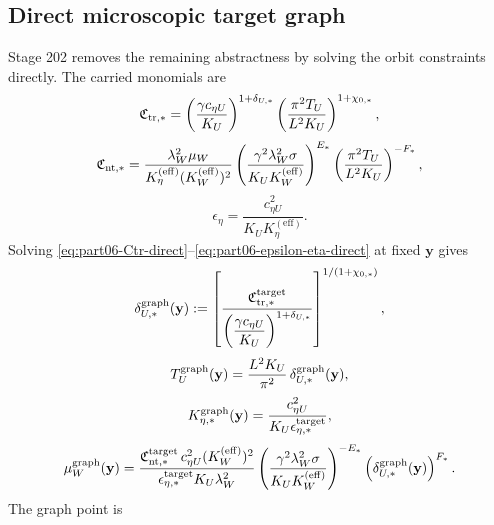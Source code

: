 \subsection{Direct microscopic target graph}
\label{subsec:part06-direct-target-graph}

Stage 202 removes the remaining abstractness by solving the orbit constraints directly.  The carried monomials are
\begin{equation}
\label{eq:part06-Ctr-direct}
\mathfrak C_{{\rm tr},*}
=
\left(\frac{\gamma c_{\eta U}}{K_U}\right)^{1+\delta_{U,*}}
\left(\frac{\pi^2T_U}{L^2K_U}\right)^{1+\chi_{0,*}},
\end{equation}
\begin{equation}
\label{eq:part06-Cnt-direct}
\mathfrak C_{{\rm nt},*}
=
\frac{\lambda_W^2\mu_W}{K_\eta^{(\mathrm{eff})}(K_W^{(\mathrm{eff})})^2}
\left(\frac{\gamma^2\lambda_W^2\sigma}{K_UK_W^{(\mathrm{eff})}}\right)^{E_*}
\left(\frac{\pi^2T_U}{L^2K_U}\right)^{-F_*},
\end{equation}
\begin{equation}
\label{eq:part06-epsilon-eta-direct}
\epsilon_\eta=\frac{c_{\eta U}^2}{K_UK_\eta^{(\mathrm{eff})}}.
\end{equation}
Solving \eqref{eq:part06-Ctr-direct}--\eqref{eq:part06-epsilon-eta-direct} at fixed \(\mathbf y\) gives
\begin{equation}
\label{eq:part06-deltaU-graph}
\delta_{U,*}^{\rm graph}(\mathbf y)
:=
\left[
\frac{\mathfrak C_{{\rm tr},*}^{\rm target}}
{\left(\dfrac{\gamma c_{\eta U}}{K_U}\right)^{1+\delta_{U,*}}}
\right]^{1/(1+\chi_{0,*})},
\end{equation}
\begin{equation}
\label{eq:part06-TU-graph}
T_U^{\rm graph}(\mathbf y)
=
\frac{L^2K_U}{\pi^2}\,\delta_{U,*}^{\rm graph}(\mathbf y),
\end{equation}
\begin{equation}
\label{eq:part06-Keta-graph}
K_{\eta,*}^{\rm graph}(\mathbf y)
=
\frac{c_{\eta U}^2}{K_U\epsilon_{\eta,*}^{\rm target}},
\end{equation}
\begin{equation}
\label{eq:part06-muW-graph}
\mu_W^{\rm graph}(\mathbf y)
=
\frac{\mathfrak C_{{\rm nt},*}^{\rm target}\,c_{\eta U}^2(K_W^{(\mathrm{eff})})^2}
{\epsilon_{\eta,*}^{\rm target}K_U\lambda_W^2}
\left(\frac{\gamma^2\lambda_W^2\sigma}{K_UK_W^{(\mathrm{eff})}}\right)^{-E_*}
\left(\delta_{U,*}^{\rm graph}(\mathbf y)\right)^{F_*}.
\end{equation}
The graph point is
